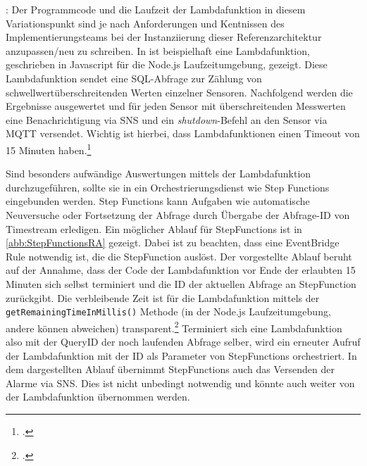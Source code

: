 : Der Programmcode und die Laufzeit der Lambdafunktion in diesem Variationspunkt sind je nach Anforderungen und Kentnissen des Implementierungsteams bei der Instanziierung dieser Referenzarchitektur anzupassen/neu zu schreiben. In  ist beispielhaft eine Lambdafunktion, geschrieben in Javascript für die Node.js Laufzeitumgebung, gezeigt. Diese Lambdafunktion sendet eine \ac{SQL}-Abfrage zur Zählung von schwellwertüberschreitenden Werten einzelner Sensoren. Nachfolgend werden die Ergebnisse ausgewertet und für jeden Sensor mit überschreitenden Messwerten eine Benachrichtigung via SNS und ein \textit{shutdown}-Befehl an den Sensor via \ac{MQTT} versendet. Wichtig ist hierbei, dass Lambdafunktionen einen Timeout von 15 Minuten haben.\footcite[Vgl.][]{AmazonWebServicesInc..o.J.bv} 

Sind besonders aufwändige Auswertungen mittels der Lambdafunktion durchzugeführen, sollte sie in ein Orchestrierungsdienst wie Step Functions eingebunden werden. Step Functions kann Aufgaben wie automatische Neuversuche oder Fortsetzung der Abfrage durch Übergabe der Abfrage-ID von Timestream erledigen. Ein möglicher Ablauf für StepFunctions ist in \autoref{abb:StepFunctionsRA} gezeigt. Dabei ist zu beachten, dass eine EventBridge Rule notwendig ist, die die StepFunction auslöst. Der vorgestellte Ablauf beruht auf der Annahme, dass der Code der Lambdafunktion vor Ende der erlaubten 15 Minuten sich selbst terminiert und die ID der aktuellen Abfrage an StepFunction zurückgibt. Die verbleibende Zeit ist für die Lambdafunktion mittels der \texttt{getRemainingTimeInMillis()} Methode (in der Node.js Laufzeitumgebung, andere können abweichen) transparent.\footcite[Vgl.][]{AmazonWebServicesInc..o.J.bw} Terminiert sich eine Lambdafunktion also mit der QueryID der noch laufenden Abfrage selber, wird ein erneuter Aufruf der Lambdafunktion mit der ID als Parameter von StepFunctions orchestriert. In dem dargestellten Ablauf übernimmt StepFunctions auch das Versenden der Alarme via \ac{SNS}. Dies ist nicht unbedingt notwendig und könnte auch weiter von der Lambdafunktion übernommen werden.

